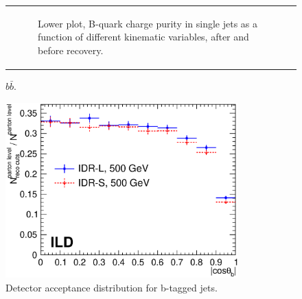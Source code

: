 \documentclass[preprint]{elsarticle}
\begin{document}
\begin{itemize}
\begin{figure}[!ht]
\begin{tabular}{l}
\begin{subfigure}{\textwidth}
      \caption{Lower plot, B-quark charge purity in single jets as a function of different kinematic variables, after and before recovery.}
      \label{vr_and_bquarkpurity_bbbar:b}
    \end{subfigure}%
  \end{tabular}
  \caption{$b\bar{b}$.  }
  \label{vr_and_bquarkpurity_bbbar}
\end{figure}

\begin{figure}[h!]
\centering
  \includegraphics[width=0.8\textwidth]{figures_BBbar/acceptance_2models_v2.eps} 
\caption{Detector acceptance distribution for b-tagged jets.}
\label{fig_acceptance_bb}
\end{figure}


\end{itemize}
\end{document}
